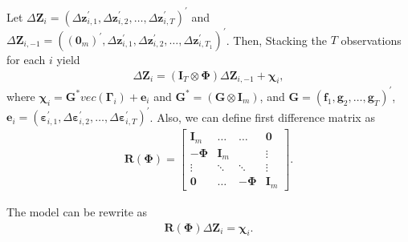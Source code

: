 \documentclass[12pt,a4paper,hyperref]{article}
\begin{document}
Let $\Delta \boldsymbol{Z}_{i}=\left(\Delta \boldsymbol{z}_{i,1}^{'}, \Delta \boldsymbol{z}_{i,2}^{'},\ldots, \Delta \boldsymbol{z}_{i,T}^{'} \right)^{'}$ and $\Delta \boldsymbol{Z}_{i,-1}=\left((\boldsymbol{0}_{m})^{'}, \Delta \boldsymbol{z}_{i,1}^{'}, \Delta \boldsymbol{z}_{i,2}^{'},\ldots, \Delta \boldsymbol{z}_{i,T_1}^{'} \right)^{'}$. Then, Stacking the $T$ observations for each $i$ yield
\begin{align}
\Delta \boldsymbol{Z}_{i}=\left(\boldsymbol{I}_{T}\otimes  \boldsymbol{\Phi} \right)\Delta \boldsymbol{Z}_{i,-1}+\boldsymbol{\chi}_{i},
\end{align}
where
 $\boldsymbol{\chi}_{i}= \boldsymbol{G}^{\ast}  vec \left(\boldsymbol{\Gamma}_{i}\right)+\boldsymbol{e}_{i}$  and  $\boldsymbol{G}^{\ast}=\left(\boldsymbol{G} \otimes \boldsymbol{I}_{m} \right) $, and $\boldsymbol{G}=\left(\boldsymbol{f}_{1}, \boldsymbol{g}_{2},\ldots, \boldsymbol{g}_{T} \right)^{'}$, $\boldsymbol{e}_{i}=\left( \boldsymbol{\varepsilon}_{i,1}^{'}, \Delta \boldsymbol{\varepsilon}_{i,2}^{'},\ldots,\Delta \boldsymbol{\varepsilon}_{i,T}^{'} \right)^{'}$.
Also, we can  define first difference matrix as
\begin{align}
\boldsymbol{R}(\boldsymbol{\Phi})=
\begin{bmatrix}
\boldsymbol{I}_{m} & \ldots             &\ldots & \boldsymbol{0} \\
-\boldsymbol{\Phi} & \boldsymbol{I}_{m} &       &           \vdots     \\
  \vdots        &       \ddots       &  \ddots &       \vdots       \\
    \boldsymbol{0} &   \ldots &    -\boldsymbol{\Phi}    &  \boldsymbol{I}_{m}
\end{bmatrix}.
\end{align}

The model can be rewrite as
\begin{align}
\boldsymbol{R\left( \Phi\right)} \Delta \boldsymbol{Z}_{i}=\boldsymbol{\chi}_{i}. \label{7}
\end{align}
\end{document}
